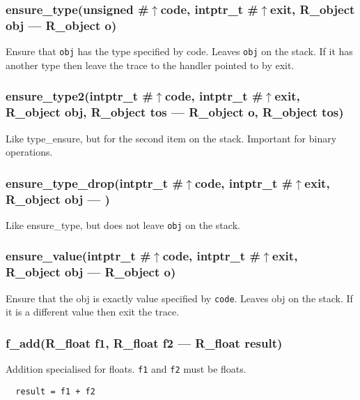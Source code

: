 \subsubsection{ensure\_type(unsigned \#$\uparrow$code, intptr\_t \#$\uparrow$exit, R\_object obj --- R\_object o)}
\vspace{-1em}Ensure that \texttt{obj} has the type specified by code. Leaves \texttt{obj} on the stack. If it has another type then leave the trace to the handler pointed to by exit. \vspace{-1em}
\subsubsection{ensure\_type2(intptr\_t \#$\uparrow$code, intptr\_t \#$\uparrow$exit, R\_object obj, R\_object tos --- R\_object o, R\_object tos)}
\vspace{-1em}Like type\_ensure, but for the second item on the stack. Important for binary operations. \vspace{-1em}
\subsubsection{ensure\_type\_drop(intptr\_t \#$\uparrow$code, intptr\_t \#$\uparrow$exit, R\_object obj --- )}
\vspace{-1em}Like ensure\_type, but does not leave \texttt{obj} on the stack. \vspace{-1em}
\subsubsection{ensure\_value(intptr\_t \#$\uparrow$code, intptr\_t \#$\uparrow$exit, R\_object obj --- R\_object o)}
\vspace{-1em}Ensure that the obj is exactly value specified by \texttt{code}. Leaves obj on the stack. If it is a different value then exit the trace. \vspace{-1em}
\subsubsection{f\_add(R\_float f1, R\_float f2 --- R\_float result)}
\vspace{-1em}Addition specialised for floats. \texttt{f1} and \texttt{f2} must be floats. \vspace{-1em}\begin{verbatim}
  result = f1 + f2
\end{verbatim}
\vspace{-1em}\vspace{-1em}
